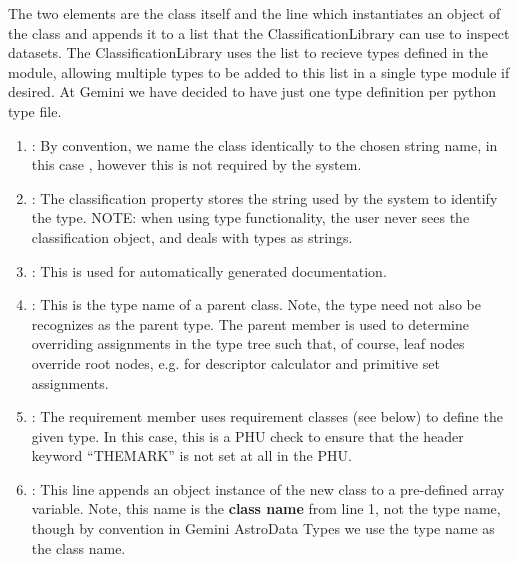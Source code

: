 \documentclass[letterpaper,10pt,english]{sphinxmanual}
\begin{document}
The two elements are the class itself and the  line
which instantiates an object of the class and appends it to a list that the
ClassificationLibrary can use to inspect datasets. The ClassificationLibrary uses the
 list to recieve types defined in the module, allowing multiple types to be
added to this list in a single type module if desired. At Gemini we have decided to
have just one type definition per python type file.
\begin{enumerate}
\item {} 
:
By convention, we name the class identically to the chosen string name, in
this case , however this is not required by the system.

\item {} 
:
The classification  property stores the string used by the system
to identify the type. NOTE: when using type functionality, the user never
sees the classification object, and deals with types as strings.

\item {} 
:
This is used for automatically generated documentation.

\item {} 
:
This is the type name of a parent class.  Note, the type need not also be
recognizes as the parent type.  The parent member is used to determine
overriding assignments in the type tree such that, of course, leaf nodes
override root nodes, e.g. for descriptor calculator and primitive set
assignments.

\item {} 
:
The requirement member uses requirement classes (see below) to define the given type.
In this case, this is a PHU check to ensure that the header keyword ``THEMARK'' is not set at all
in the PHU.

\item {} 
:
This line appends an object instance of the new class to a pre-defined
 array variable. Note, this name is the \textbf{class name} from line
1, not the type name, though by convention in Gemini AstroData Types we use
the type name as the class name.

\end{enumerate}
\end{document}
